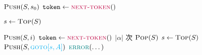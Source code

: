
\begin{algorithm}[H]
\begin{algorithmic}[1]
    \State $\Call{Push}{S, s_{0}}$ 
    \State $\token \gets \Call{\purple{next-token}}{\null}$

    \hStatex
      \State $s \gets \Call{Top}{S}$

      \hStatex
       
        \State $\Call{Push}{S, i}$ 
        \State $\token \gets \Call{\purple{next-token}}{\null}$
       
        \State $|\alpha|$ 次 $\Call{Pop}{S}$
        \State $s \gets \Call{Top}{S}$
        \State $\Call{Push}{S, \cyan{\goto[s, A]}}$ 
       
      \Else
        \State $\Call{\teal{error}}{\dots}$
      \EndIf
    \EndWhile
  \EndProcedure
\end{algorithmic}
\end{algorithm}